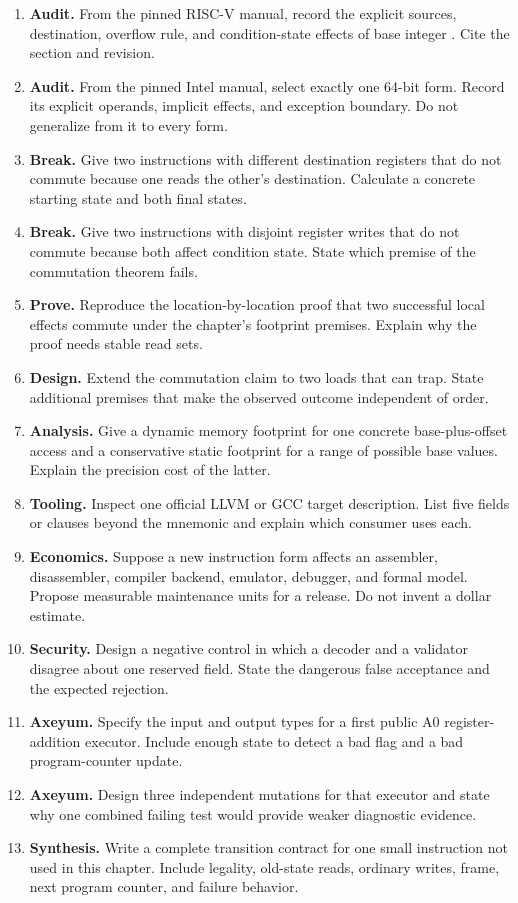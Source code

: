 \begin{enumerate}
architectural instructions.
\item \textbf{Audit.} From the pinned RISC-V manual, record the explicit
sources, destination, overflow rule, and condition-state effects of base
integer . Cite the section and revision.
\item \textbf{Audit.} From the pinned Intel manual, select exactly one
64-bit  form. Record its explicit operands, implicit effects, and
exception boundary. Do not generalize from it to every form.
\item \textbf{Break.} Give two instructions with different destination
registers that do not commute because one reads the other's destination.
Calculate a concrete starting state and both final states.
\item \textbf{Break.} Give two instructions with disjoint register writes
that do not commute because both affect condition state. State which premise
of the commutation theorem fails.
\item \textbf{Prove.} Reproduce the location-by-location proof that two
successful local effects commute under the chapter's footprint premises.
Explain why the proof needs stable read sets.
\item \textbf{Design.} Extend the commutation claim to two loads that can
trap. State additional premises that make the observed outcome independent of
order.
\item \textbf{Analysis.} Give a dynamic memory footprint for one concrete
base-plus-offset access and a conservative static footprint for a range of
possible base values. Explain the precision cost of the latter.
\item \textbf{Tooling.} Inspect one official LLVM or GCC target description.
List five fields or clauses beyond the mnemonic and explain which consumer
uses each.
\item \textbf{Economics.} Suppose a new instruction form affects an
assembler, disassembler, compiler backend, emulator, debugger, and formal
model. Propose measurable maintenance units for a release. Do not invent a
dollar estimate.
\item \textbf{Security.} Design a negative control in which a decoder and a
validator disagree about one reserved field. State the dangerous false
acceptance and the expected rejection.
\item \textbf{Axeyum.} Specify the input and output types for a first public
A0 register-addition executor. Include enough state to detect a bad flag and a
bad program-counter update.
\item \textbf{Axeyum.} Design three independent mutations for that executor
and state why one combined failing test would provide weaker diagnostic
evidence.
\item \textbf{Synthesis.} Write a complete transition contract for one small
instruction not used in this chapter. Include legality, old-state reads,
ordinary writes, frame, next program counter, and failure behavior.
\end{enumerate}
